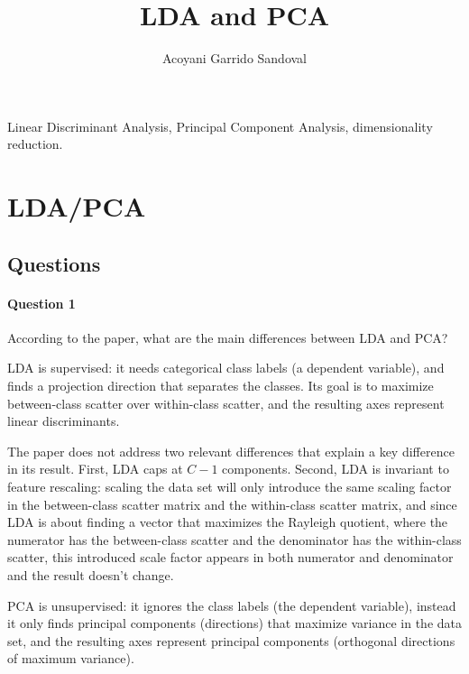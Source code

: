 \documentclass[journal]{IEEEtran}
\begin{document}
\title{LDA and PCA}

\author{Acoyani Garrido Sandoval}

\maketitle

\begin{IEEEkeywords}
Linear Discriminant Analysis, Principal Component Analysis, dimensionality reduction.
\end{IEEEkeywords}

\section{LDA/PCA}




\subsection{Questions}


\paragraph{Question 1} According to the paper, what are the main differences between LDA and PCA?

LDA is supervised: it needs categorical class labels (a dependent variable), and finds a projection direction that separates the classes. Its goal is to maximize between-class scatter over within-class scatter, and the resulting axes represent linear discriminants. 

The paper does not address two relevant differences that explain a key difference in its result. First, LDA caps at $C - 1$ components. Second, LDA is invariant to feature rescaling: scaling the data set will only introduce the same scaling factor in the between-class scatter matrix and the within-class scatter matrix, and since LDA is about finding a vector that maximizes the Rayleigh quotient, where the numerator has the between-class scatter and the denominator has the within-class scatter, this introduced scale factor appears in both numerator and denominator and the result doesn't change.

PCA is unsupervised: it ignores the class labels (the dependent variable), instead it only finds principal components (directions) that maximize variance in the data set, and the resulting axes represent principal components (orthogonal directions of maximum variance). 
\end{document}
